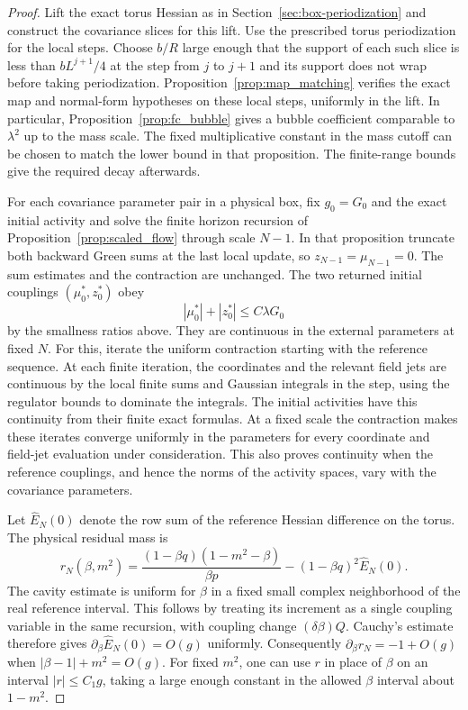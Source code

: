 \documentclass[11pt]{article}
\begin{document}
\begin{proof}
Lift the exact torus Hessian as in Section~\ref{sec:box-periodization}
and construct the covariance slices for this lift. Use the
prescribed torus periodization for the local steps. Choose
\(b/R\) large enough that the support of each such slice is
less than \(bL^{j+1}/4\) at the step from \(j\) to \(j+1\) and its support
does not wrap before taking periodization. Proposition~\ref{prop:map_matching} verifies the exact map and
normal-form hypotheses on these local steps, uniformly in the lift. In particular, Proposition~\ref{prop:fc_bubble}
gives a bubble coefficient comparable to \(\lambda^2\) up to the
mass scale. The fixed multiplicative constant in the mass cutoff
can be chosen to match the lower bound in that proposition.
The finite-range bounds give the required decay afterwards.

For each covariance parameter pair in a physical box, fix
\(g_0=G_0\) and the exact initial activity and solve the finite
horizon recursion of Proposition~\ref{prop:scaled_flow} through
scale \(N-1\). In that proposition truncate both backward
Green sums at the last local update, so \(z_{N-1}=\mu_{N-1}=0\).
The sum estimates and the contraction are unchanged. The two
returned initial couplings \((\mu_0^*,z_0^*)\) obey
\[
 |\mu_0^*|+|z_0^*|\le C\lambda G_0
\]
by the smallness ratios above. They are continuous in the
external parameters at fixed \(N\). For this, iterate the
uniform contraction starting with the reference sequence.
At each finite iteration, the coordinates and the relevant
field jets are continuous by the local finite sums and
Gaussian integrals in the step, using the regulator bounds
to dominate the integrals. The initial activities have this
continuity from their finite exact formulas. At a fixed scale
the contraction makes these iterates converge uniformly in the
parameters for every coordinate and field-jet evaluation
under consideration. This also proves continuity when the
reference couplings, and hence the norms of the activity
spaces, vary with the covariance parameters.

Let \(\widehat E_N(0)\) denote the row sum of the reference
Hessian difference on the torus. The physical residual mass is
\[
 r_N(\beta,m^2)
 =\frac{(1-\beta q)(1-m^2-\beta)}{\beta p}
     -(1-\beta q)^2\widehat E_N(0).
\]
The cavity estimate is uniform for \(\beta\) in a fixed small
complex neighborhood of the real reference interval. This
follows by treating its increment as a single coupling
variable in the same recursion, with coupling change
\((\delta\beta)Q\). Cauchy's estimate therefore gives
\(\partial_\beta\widehat E_N(0)=O(g)\) uniformly. Consequently
\(\partial_\beta r_N=-1+O(g)\) when
\(|\beta-1|+m^2=O(g)\). For fixed \(m^2\), one can
use \(r\) in place of \(\beta\) on an interval
\(|r|\le C_1 g\), taking a large enough constant in the allowed
\(\beta\) interval about \(1-m^2\).


\end{proof}
\end{document}
